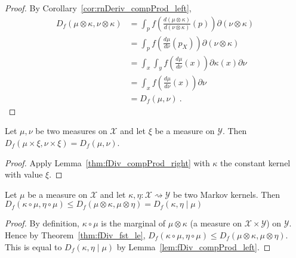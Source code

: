 \begin{proof}
By Corollary~\ref{cor:rnDeriv_compProd_left},
\begin{align*}
D_f(\mu \otimes \kappa, \nu \otimes \kappa)
&= \int_{p} f\left(\frac{d (\mu \otimes \kappa)}{d (\nu \otimes \kappa)}(p)\right) \partial(\nu \otimes \kappa)
\\
&= \int_{p} f\left(\frac{d \mu}{d \nu}(p_X)\right) \partial(\nu \otimes \kappa)
\\
&= \int_x \int_y f\left(\frac{d \mu}{d \nu}(x)\right) \partial \kappa(x) \partial \nu
\\
&= \int_x f\left(\frac{d \mu}{d \nu}(x)\right) \partial \nu
\\
&= D_f(\mu, \nu)
\: .
\end{align*}
\end{proof}

\begin{corollary}
  \label{cor:fDiv_prod_right}
  Let $\mu, \nu$ be two measures on $\mathcal X$ and let $\xi$ be a measure on $\mathcal Y$.
  Then $D_f(\mu \times \xi, \nu \times \xi) = D_f(\mu, \nu)$.
\end{corollary}

\begin{proof}
Apply Lemma~\ref{thm:fDiv_compProd_right} with $\kappa$ the constant kernel with value $\xi$.
\end{proof}

\begin{theorem}
  \label{thm:fDiv_comp_le_condFDiv}
  Let $\mu$ be a measure on $\mathcal X$ and let $\kappa, \eta : \mathcal X \rightsquigarrow \mathcal Y$ be two Markov kernels.
  Then $D_f(\kappa \circ \mu, \eta \circ \mu) \le D_f(\mu \otimes \kappa, \mu \otimes \eta) = D_f(\kappa, \eta \mid \mu)$
\end{theorem}

\begin{proof}
By definition, $\kappa \circ \mu$ is the marginal of $\mu \otimes \kappa$ (a measure on $\mathcal X \times \mathcal Y$) on $\mathcal Y$. Hence by Theorem~\ref{thm:fDiv_fst_le}, $D_f(\kappa \circ \mu, \eta \circ \mu) \le D_f(\mu \otimes \kappa, \mu \otimes \eta)$. This is equal to $D_f(\kappa, \eta \mid \mu)$ by Lemma~\ref{lem:fDiv_compProd_left}.
\end{proof}

